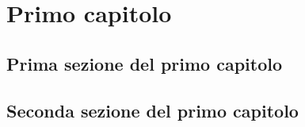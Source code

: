\chapter{Primo capitolo}

\section{Prima sezione del primo capitolo}
\lipsum

\section{Seconda sezione del primo capitolo}
\lipsum
